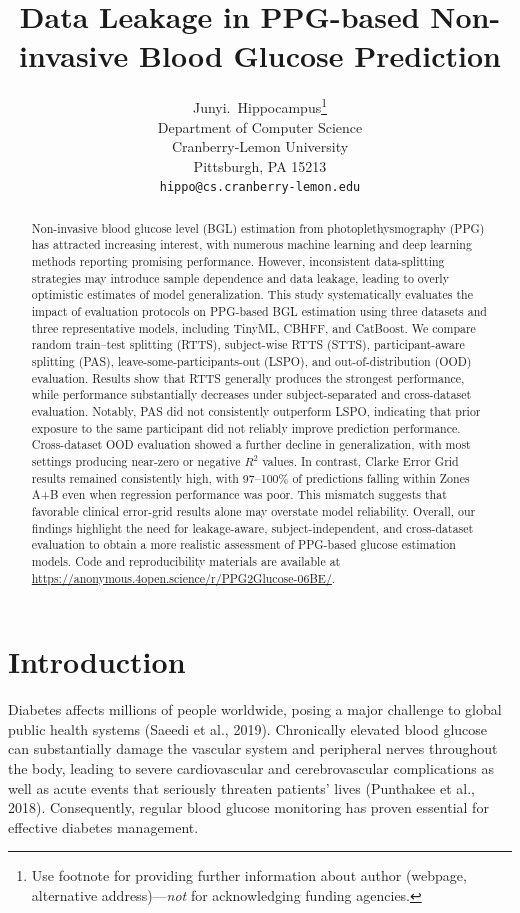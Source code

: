 \documentclass{article}
\title{Data Leakage in PPG-based Non-invasive Blood Glucose Prediction}
\author{%
  Junyi.~Hippocampus\thanks{Use footnote for providing further information
    about author (webpage, alternative address)---\emph{not} for acknowledging
    funding agencies.} \\
  Department of Computer Science\\
  Cranberry-Lemon University\\
  Pittsburgh, PA 15213 \\
  \texttt{hippo@cs.cranberry-lemon.edu} \\
}
\begin{document}
\maketitle


\begin{abstract}

Non-invasive blood glucose level (BGL) estimation from photoplethysmography (PPG) has attracted increasing interest, with numerous machine learning and deep learning methods reporting promising performance. However, inconsistent data-splitting strategies may introduce sample dependence and data leakage, leading to overly optimistic estimates of model generalization. This study systematically evaluates the impact of evaluation protocols on PPG-based BGL estimation using three datasets and three representative models, including TinyML, CBHFF, and CatBoost. We compare random train--test splitting (RTTS), subject-wise RTTS (STTS), participant-aware splitting (PAS), leave-some-participants-out (LSPO), and out-of-distribution (OOD) evaluation. Results show that RTTS generally produces the strongest performance, while performance substantially decreases under subject-separated and cross-dataset evaluation. Notably, PAS did not consistently outperform LSPO, indicating that prior exposure to the same participant did not reliably improve prediction performance. Cross-dataset OOD evaluation showed a further decline in generalization, with most settings producing near-zero or negative $R^2$ values. In contrast, Clarke Error Grid results remained consistently high, with 97--100\% of predictions falling within Zones A+B even when regression performance was poor. This mismatch suggests that favorable clinical error-grid results alone may overstate model reliability. Overall, our findings highlight the need for leakage-aware, subject-independent, and cross-dataset evaluation to obtain a more realistic assessment of PPG-based glucose estimation models. Code and reproducibility materials are available at \url{https://anonymous.4open.science/r/PPG2Glucose-06BE/}.


\end{abstract}

\section{Introduction}

Diabetes affects millions of people worldwide, posing a major challenge to global public health systems (Saeedi et al., 2019). Chronically elevated blood glucose can substantially damage the vascular system and peripheral nerves throughout the body, leading to severe cardiovascular and cerebrovascular complications as well as acute events that seriously threaten patients' lives (Punthakee et al., 2018). Consequently, regular blood glucose monitoring has proven essential for effective diabetes management.
\end{document}
